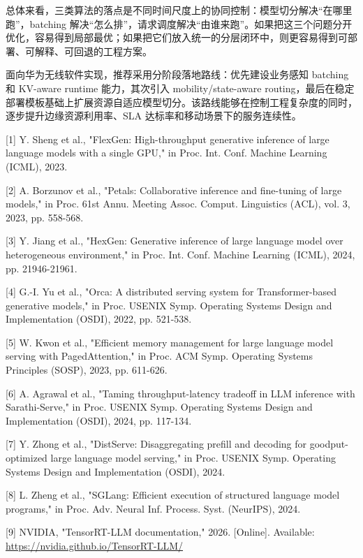 \documentclass[a4paper,10pt]{ctexart}
\begin{document}
总体来看，三类算法的落点是不同时间尺度上的协同控制：模型切分解决“在哪里跑”，batching 解决“怎么排”，请求调度解决“由谁来跑”。如果把这三个问题分开优化，容易得到局部最优；如果把它们放入统一的分层闭环中，则更容易得到可部署、可解释、可回退的工程方案。


面向华为无线软件实现，推荐采用分阶段落地路线：优先建设业务感知 batching 和 KV-aware runtime 能力，其次引入 mobility/state-aware routing，最后在稳定部署模板基础上扩展资源自适应模型切分。该路线能够在控制工程复杂度的同时，逐步提升边缘资源利用率、SLA 达标率和移动场景下的服务连续性。




[1] Y. Sheng et al., "FlexGen: High-throughput generative inference of large language models with a single GPU," in Proc. Int. Conf. Machine Learning (ICML), 2023.


[2] A. Borzunov et al., "Petals: Collaborative inference and fine-tuning of large models," in Proc. 61st Annu. Meeting Assoc. Comput. Linguistics (ACL), vol. 3, 2023, pp. 558-568.


[3] Y. Jiang et al., "HexGen: Generative inference of large language model over heterogeneous environment," in Proc. Int. Conf. Machine Learning (ICML), 2024, pp. 21946-21961.


[4] G.-I. Yu et al., "Orca: A distributed serving system for Transformer-based generative models," in Proc. USENIX Symp. Operating Systems Design and Implementation (OSDI), 2022, pp. 521-538.


[5] W. Kwon et al., "Efficient memory management for large language model serving with PagedAttention," in Proc. ACM Symp. Operating Systems Principles (SOSP), 2023, pp. 611-626.


[6] A. Agrawal et al., "Taming throughput-latency tradeoff in LLM inference with Sarathi-Serve," in Proc. USENIX Symp. Operating Systems Design and Implementation (OSDI), 2024, pp. 117-134.


[7] Y. Zhong et al., "DistServe: Disaggregating prefill and decoding for goodput-optimized large language model serving," in Proc. USENIX Symp. Operating Systems Design and Implementation (OSDI), 2024.


[8] L. Zheng et al., "SGLang: Efficient execution of structured language model programs," in Proc. Adv. Neural Inf. Process. Syst. (NeurIPS), 2024.


[9] NVIDIA, "TensorRT-LLM documentation," 2026. [Online]. Available: \href{https://nvidia.github.io/TensorRT-LLM/}{https://nvidia.github.io/TensorRT-LLM/}
\end{document}
